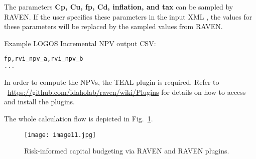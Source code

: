 The parameters \textbf{Cp, Cu, fp, Cd, inflation, and tax} can be sampled by RAVEN.
If the user specifies these parameters in the input XML ,
the values for these parameters will be replaced by the sampled values from RAVEN.

Example LOGOS Incremental NPV output CSV:
\begin{lstlisting}[language=python]
fp,rvi_npv_a,rvi_npv_b
...
\end{lstlisting}

\nb In order to compute the NPVs, the TEAL plugin is required.
Refer to ~\url{https://github.com/idaholab/raven/wiki/Plugins} for
details on how to access and install the plugins.

The whole calculation flow is depicted in Fig.~\ref{fig:LogosRAVEN}.


\begin{figure}
    \centering
    \centerline{\texttt{[image: image11.jpg]}}
    \caption{Risk-informed capital budgeting via RAVEN and RAVEN plugins.}
    \label{fig:LogosRAVEN}
\end{figure}

